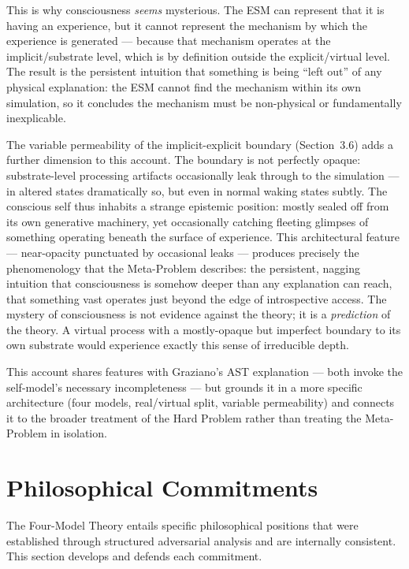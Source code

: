 \documentclass[12pt]{article}
\begin{document}
This is why consciousness \emph{seems} mysterious. The ESM can represent that it is having an experience, but it cannot represent the mechanism by which the experience is generated --- because that mechanism operates at the implicit/substrate level, which is by definition outside the explicit/virtual level. The result is the persistent intuition that something is being ``left out'' of any physical explanation: the ESM cannot find the mechanism within its own simulation, so it concludes the mechanism must be non-physical or fundamentally inexplicable.

The variable permeability of the implicit-explicit boundary (Section~3.6) adds a further dimension to this account. The boundary is not perfectly opaque: substrate-level processing artifacts occasionally leak through to the simulation --- in altered states dramatically so, but even in normal waking states subtly. The conscious self thus inhabits a strange epistemic position: mostly sealed off from its own generative machinery, yet occasionally catching fleeting glimpses of something operating beneath the surface of experience. This architectural feature --- near-opacity punctuated by occasional leaks --- produces precisely the phenomenology that the Meta-Problem describes: the persistent, nagging intuition that consciousness is somehow deeper than any explanation can reach, that something vast operates just beyond the edge of introspective access. The mystery of consciousness is not evidence against the theory; it is a \emph{prediction} of the theory. A virtual process with a mostly-opaque but imperfect boundary to its own substrate would experience exactly this sense of irreducible depth.

This account shares features with Graziano's AST explanation --- both invoke the self-model's necessary incompleteness --- but grounds it in a more specific architecture (four models, real/virtual split, variable permeability) and connects it to the broader treatment of the Hard Problem rather than treating the Meta-Problem in isolation.



\section{Philosophical Commitments}


The Four-Model Theory entails specific philosophical positions that were established through structured adversarial analysis and are internally consistent. This section develops and defends each commitment.
\end{document}
